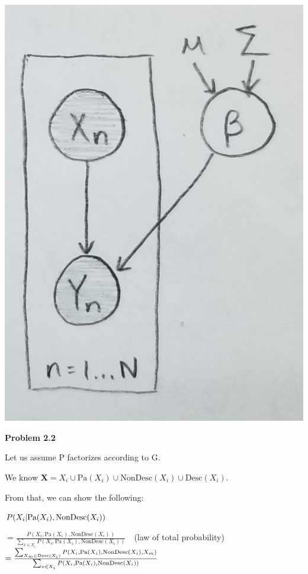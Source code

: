 \documentclass[12pt]{article}
\begin{document}
\begin{enumerate}
	\includegraphics[scale=0.2]{q2-sub1-part2-answer}
\end{enumerate}

\pagebreak\textbf{Problem 2.2}

Let us assume P factorizes according to G.

We know $\textbf{X} = X_i \cup \text{Pa}(X_i) \cup \text{NonDesc}(X_i) \cup \text{Desc}(X_i)$.

From that, we can show the following:

$P(X_i \vert \text{Pa}(X_i), \text{NonDesc}(X_i)) \\$

$= \frac{P(X_i, \text{Pa}(X_i), \text{NonDesc}(X_i))}{\sum_{x \in X_i} P(X_i, \text{Pa}(X_i), \text{NonDesc}(X_i))}\quad$(law of total probability)\\

$= \frac{\sum_{X_m \in \text{Desc}(X_i)}P(X_i, \text{Pa}(X_i), \text{NonDesc}(X_i), X_m)}{\sum_{x \in X_i} P(X_i, \text{Pa}(X_i), \text{NonDesc}(X_i))}\\$
\end{document}
